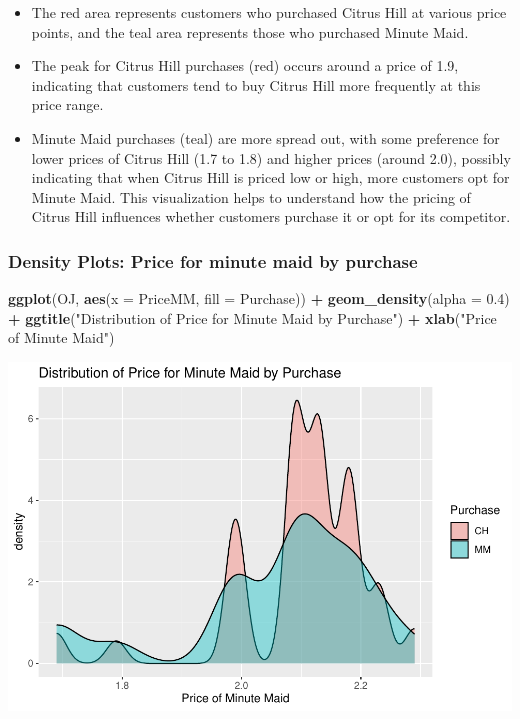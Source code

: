 \documentclass[
]{article}
\newenvironment{Shaded}{\begin{snugshade}}{\end{snugshade}}
\newcommand{\AttributeTok}[1]{\textcolor[rgb]{0.13,0.29,0.53}{#1}}
\newcommand{\FloatTok}[1]{\textcolor[rgb]{0.00,0.00,0.81}{#1}}
\newcommand{\FunctionTok}[1]{\textcolor[rgb]{0.13,0.29,0.53}{\textbf{#1}}}
\newcommand{\NormalTok}[1]{#1}
\newcommand{\SpecialCharTok}[1]{\textcolor[rgb]{0.81,0.36,0.00}{\textbf{#1}}}
\newcommand{\StringTok}[1]{\textcolor[rgb]{0.31,0.60,0.02}{#1}}
\providecommand{\tightlist}{%
  \setlength{\itemsep}{0pt}\setlength{\parskip}{0pt}}
\begin{document}
\begin{itemize}
\tightlist
\item
  The red area represents customers who purchased Citrus Hill at various
  price points, and the teal area represents those who purchased Minute
  Maid.
\item
  The peak for Citrus Hill purchases (red) occurs around a price of 1.9,
  indicating that customers tend to buy Citrus Hill more frequently at
  this price range.
\item
  Minute Maid purchases (teal) are more spread out, with some preference
  for lower prices of Citrus Hill (1.7 to 1.8) and higher prices (around
  2.0), possibly indicating that when Citrus Hill is priced low or high,
  more customers opt for Minute Maid. This visualization helps to
  understand how the pricing of Citrus Hill influences whether customers
  purchase it or opt for its competitor.
\end{itemize}

\hypertarget{density-plots-price-for-minute-maid-by-purchase}{%
\subsubsection{Density Plots: Price for minute maid by
purchase}\label{density-plots-price-for-minute-maid-by-purchase}}

\begin{Shaded}
\begin{Highlighting}[]
\FunctionTok{ggplot}\NormalTok{(OJ, }\FunctionTok{aes}\NormalTok{(}\AttributeTok{x =}\NormalTok{ PriceMM, }\AttributeTok{fill =}\NormalTok{ Purchase)) }\SpecialCharTok{+}
  \FunctionTok{geom\_density}\NormalTok{(}\AttributeTok{alpha =} \FloatTok{0.4}\NormalTok{) }\SpecialCharTok{+}
  \FunctionTok{ggtitle}\NormalTok{(}\StringTok{"Distribution of Price for Minute Maid by Purchase"}\NormalTok{) }\SpecialCharTok{+}
  \FunctionTok{xlab}\NormalTok{(}\StringTok{"Price of Minute Maid"}\NormalTok{)}
\end{Highlighting}
\end{Shaded}

\includegraphics{OJ_files/figure-latex/unnamed-chunk-6-1.pdf}
\end{document}
